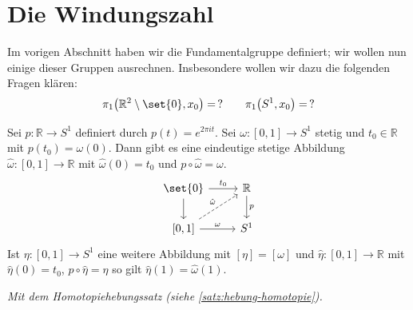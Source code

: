\newpage
\section{Die Windungszahl} %
\label{sec:die_windungszahl}
Im vorigen Abschnitt haben wir die Fundamentalgruppe definiert; wir wollen nun einige dieser Gruppen ausrechnen.
Insbesondere wollen wir dazu die folgenden Fragen klären:
\[
	\pi_1 \enbrace*{\mathbb{R}^2 \setminus \set{0}, x_0 } = \,? \qquad \pi_1 \enbrace*{S^1, x_0} = \,?  
\]

\begin{proposition}[{name=[Hebung eines Weges auf der 1-Sphäre in die reellen Zahlen]},label=prop:hebung-windung]
	Sei $p \colon \mathbb{R} \to S^1$ definiert durch $p(t) = e^{2 \pi i t}$. 
	Sei $\omega \colon [0,1] \to S^1$ stetig und $t_0 \in \mathbb{R}$ mit $p(t_0) = \omega(0)$.
	Dann gibt es eine eindeutige stetige Abbildung $\hat{\omega} \colon [0,1] \to \mathbb{R}$ mit $\hat{\omega}(0) = t_0$ und $p  \circ  \hat{\omega} = \omega$.
	\[
		\begin{tikzcd}
			\set{0} \rar{t_0} \dar& \mathbb{R} \dar{p} \\
			{[0,1]} \rar{\omega} \urar[dashed]{\hat{\omega}}& S^1 
		\end{tikzcd}
	\]
	Ist $\eta \colon [0,1] \to S^1$ eine weitere Abbildung mit $[\eta] = [\omega]$ und $\hat{\eta} \colon [0,1] \to \mathbb{R}$ mit $\hat{\eta}(0)= t_0$, $p \circ \hat{\eta} = \eta$ so gilt $\hat{\eta}(1) = \hat{\omega}(1)$.
\end{proposition}
\begin{beweis}
	\emph{Mit dem Homotopiehebungssatz (siehe \cref{satz:hebung-homotopie}).}
\end{beweis}

